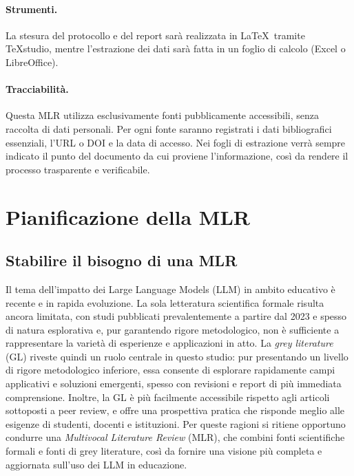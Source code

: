 \documentclass[a4paper,9pt]{article}
\begin{document}
	\paragraph{Strumenti.} 
	La stesura del protocollo e del report sarà realizzata in \LaTeX\ tramite TeXstudio, mentre l’estrazione dei dati sarà fatta in un foglio di calcolo (Excel o LibreOffice). 
	
	\paragraph{Tracciabilità.}
	Questa MLR utilizza esclusivamente fonti pubblicamente accessibili, senza raccolta di dati personali. 
	Per ogni fonte saranno registrati i dati bibliografici essenziali, l’URL o DOI e la data di accesso. 
	Nei fogli di estrazione verrà sempre indicato il punto del documento da cui proviene l’informazione, così da rendere il processo trasparente e verificabile.
	
	\section{Pianificazione della MLR}
	
	\subsection{Stabilire il bisogno di una MLR}
	
	Il tema dell’impatto dei Large Language Models (LLM) in ambito educativo è recente e in rapida evoluzione. 
	La sola letteratura scientifica formale risulta ancora limitata, con studi pubblicati prevalentemente a partire dal 2023 e spesso di natura esplorativa e, pur garantendo rigore metodologico, non è sufficiente a rappresentare la varietà di esperienze e applicazioni in atto.\newline
	La \emph{grey literature} (GL) riveste quindi un ruolo centrale in questo studio: pur presentando un livello di rigore metodologico inferiore, essa consente di esplorare rapidamente campi applicativi e soluzioni emergenti, spesso con revisioni e report di più immediata comprensione. 
	Inoltre, la GL è più facilmente accessibile rispetto agli articoli sottoposti a peer review, e offre una prospettiva pratica che risponde meglio alle esigenze di studenti, docenti e istituzioni.\newline
	Per queste ragioni si ritiene opportuno condurre una \emph{Multivocal Literature Review} (MLR), che combini fonti scientifiche formali e fonti di grey literature, così da fornire una visione più completa e aggiornata sull’uso dei LLM in educazione.
	
\end{document}
